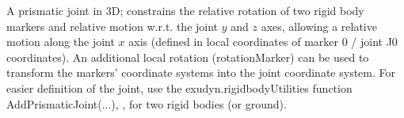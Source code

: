 \ei

%
\newpage


\label{sec:item:ObjectJointPrismaticX}
A prismatic joint in 3D; constrains the relative rotation of two rigid body markers and relative motion w.r.t. the joint $y$ and $z$ axes, allowing a relative motion along the joint $x$ axis (defined in local coordinates of marker 0 / joint J0 coordinates). An additional local rotation (rotationMarker) can be used to transform the markers' coordinate systems into the joint coordinate system. For easier definition of the joint, use the exudyn.rigidbodyUtilities function AddPrismaticJoint(...), , for two rigid bodies (or ground). 
\vspace{12pt}\\

